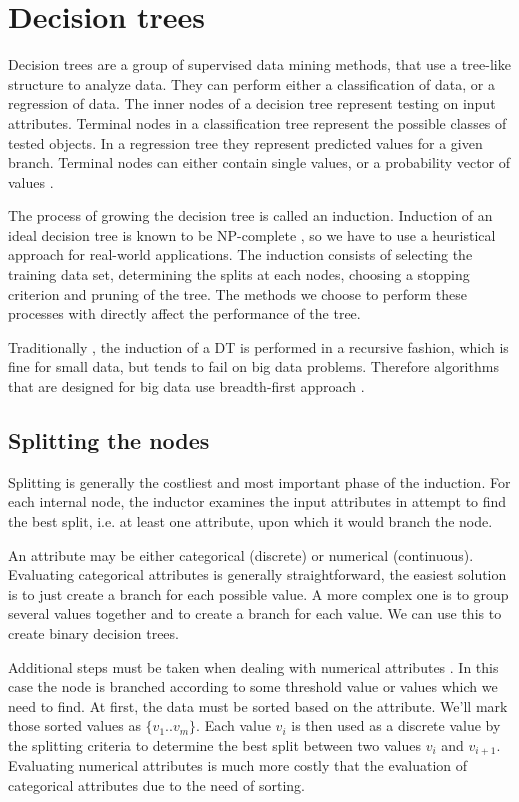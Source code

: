 \documentclass[thesis=B,english]{FITthesis}[2012/10/20]
\begin{document}
\chapter{Decision trees}
\label{chap:DT}
		Decision trees are a group of supervised data mining methods, that use a tree-like structure to analyze data. They can perform either a classification of data, or a regression of data. The inner nodes of a decision tree represent testing on input attributes. \cite{CMP07} Terminal nodes in a classification tree represent the possible classes of tested objects. In a regression tree they represent predicted values for a given branch. Terminal nodes can either contain single values, or a probability vector of values \cite{TOP_DOWN_INDUCTION_SURVEY}. 

		The process of growing the decision tree is called an induction. Induction of an ideal decision tree is known to be NP-complete \cite{NP-COMPLETE}, so we have to use a heuristical approach for real-world applications. The induction consists of selecting the training data set, determining the splits at each nodes, choosing a stopping criterion and pruning of the tree. The methods we choose to perform these processes with directly affect the performance of the tree. 

		Traditionally \cite{CART,C45-NUMERICAL}, the induction of a DT is performed in a recursive fashion, which is fine for small data, but tends to fail on big data problems. Therefore algorithms that are designed for big data use breadth-first approach \cite{mehta1996sliq,ben2010streaming}.
		
		\section{Splitting the nodes}
			Splitting is generally the costliest and most important phase of the induction. For each internal node, the inductor examines the input attributes in attempt to find the best split, i.e. at least one attribute, upon which it would branch the node. 

			An attribute may be either categorical (discrete) or numerical (continuous). Evaluating categorical attributes is generally straightforward, the easiest solution is to just create a branch for each possible value. A more complex one is to group several values together and to create a branch for each value. We can use this to create binary decision trees.

			Additional steps must be taken when dealing with numerical attributes \cite{C45-NUMERICAL}.	 In this case the node is branched according to some threshold value or values which we need to find. At first, the data must be sorted based on the attribute. We'll mark those sorted values as \(\{v_1..v_m\}\). Each value \(v_i\) is then used as a discrete value by the splitting criteria to determine the best split between two values \(v_i\) and \(v_{i+1}\). Evaluating numerical attributes is much more costly that the evaluation of categorical attributes due to the need of sorting.
\end{document}
